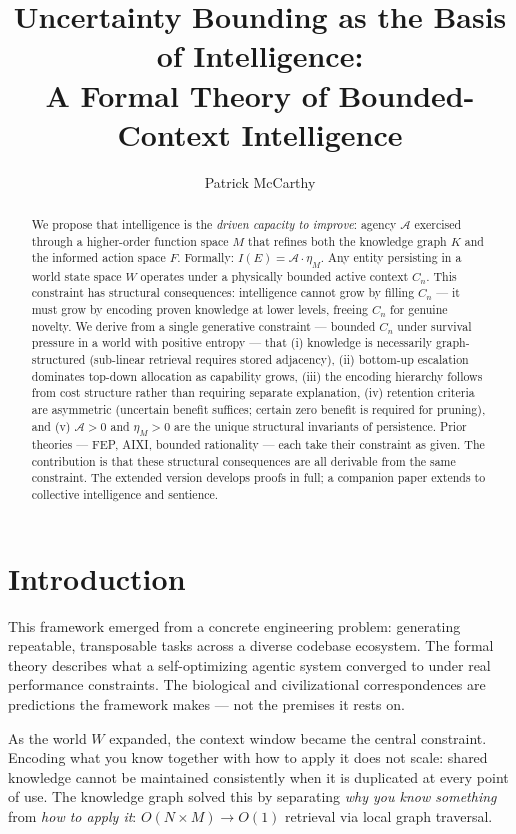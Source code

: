 \documentclass[11pt]{article}
\title{Uncertainty Bounding as the Basis of Intelligence:\\A Formal Theory of Bounded-Context Intelligence}
\author{Patrick McCarthy}
\date{}
\begin{document}
\maketitle

\begin{abstract}
We propose that intelligence is the \emph{driven capacity to improve}: agency $\mathcal{A}$ exercised through a higher-order function space $M$ that refines both the knowledge graph $K$ and the informed action space $F$. Formally: $I(E) = \mathcal{A} \cdot \eta_M$. Any entity persisting in a world state space $W$ operates under a physically bounded active context $C_n$. This constraint has structural consequences: intelligence cannot grow by filling $C_n$ --- it must grow by encoding proven knowledge at lower levels, freeing $C_n$ for genuine novelty. We derive from a single generative constraint --- bounded $C_n$ under survival pressure in a world with positive entropy --- that (i) knowledge is necessarily graph-structured (sub-linear retrieval requires stored adjacency), (ii) bottom-up escalation dominates top-down allocation as capability grows, (iii) the encoding hierarchy follows from cost structure rather than requiring separate explanation, (iv) retention criteria are asymmetric (uncertain benefit suffices; certain zero benefit is required for pruning), and (v) $\mathcal{A} > 0$ and $\eta_M > 0$ are the unique structural invariants of persistence. Prior theories --- FEP, AIXI, bounded rationality --- each take their constraint as given. The contribution is that these structural consequences are all derivable from the same constraint. The extended version develops proofs in full; a companion paper extends to collective intelligence and sentience.
\end{abstract}

\section{Introduction}

This framework emerged from a concrete engineering problem: generating repeatable, transposable tasks across a diverse codebase ecosystem. The formal theory describes what a self-optimizing agentic system converged to under real performance constraints. The biological and civilizational correspondences are predictions the framework makes --- not the premises it rests on.

As the world $W$ expanded, the context window became the central constraint. Encoding what you know together with how to apply it does not scale: shared knowledge cannot be maintained consistently when it is duplicated at every point of use. The knowledge graph solved this by separating \emph{why you know something} from \emph{how to apply it}: $O(N \times M) \to O(1)$ retrieval via local graph traversal.
\end{document}
